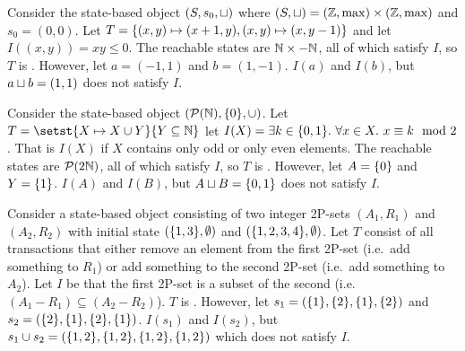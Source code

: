 \begin{example}
  Consider the state-based object $(S, s_0, \sqcup)$ where $(S, \sqcup) = (\mathbb{Z},
  \max) \times (\mathbb{Z}, \max)$ and $s_0 = (0, 0)$. Let $T = \{(x, y) \mapsto
  (x + 1, y), (x, y) \mapsto (x, y - 1)\}$ and let $I((x, y)) = xy \leq 0$. The
  reachable states are $\mathbb{N} \times -\mathbb{N}$, all of which satisfy $I$, so $T$
  is \Iconfluent{}. However, let $a = (-1, 1)$ and $b = (1, -1)$. $I(a)$ and
  $I(b)$, but $a \sqcup b = (1, 1)$ does not satisfy $I$.
\end{example}

\begin{example}
  Consider the state-based object $(\mathcal{P}(\mathbb{N}), \{0\}, \cup)$. Let $T =
  \setst{X \mapsto X \cup Y}{Y \subseteq \nats}$ let $I(X) = \exists k \in
  \{0, 1\}.\ \forall x \in X.\ x \equiv k \mod 2$. That is $I(X)$ if $X$
  contains only odd or only even elements. The reachable states are
  $\mathcal{P}(2\mathbb{N})$, all of which satisfy $I$, so $T$ is \Iconfluent{}.
  However, let $A = \{0\}$ and $Y = \{1\}$. $I(A)$ and $I(B)$, but $A \sqcup
  B = \{0, 1\}$ does not satisfy $I$.
\end{example}

\begin{example}
  Consider a state-based object consisting of two integer 2P-sets $(A_1, R_1)$ and
  $(A_2, R_2)$ with initial state $(\{1, 3\}, \emptyset{})$ and $(\{1, 2,
  3, 4\}, \emptyset{})$. Let $T$ consist of all transactions that either remove
  an element from the first 2P-set (i.e.\ add something to $R_1$) or add
  something to the second 2P-set (i.e.\ add something to $A_2$). Let $I$ be
  that the first 2P-set is a subset of the second (i.e. $(A_1 - R_1) \subseteq
  (A_2 - R_2)$).
  $T$ is \Iconfluent{}. However, let $s_1 = (\{1\}, \{2\}, \{1\},
  \{2\})$ and $s_2 = (\{2\}, \{1\}, \{2\}, \{1\})$. $I(s_1)$ and
  $I(s_2)$, but $s_1 \cup s_2 = (\{1, 2\}, \{1, 2\}, \{1, 2\}, \{1,
  2\})$ which does not satisfy $I$.
\end{example}
